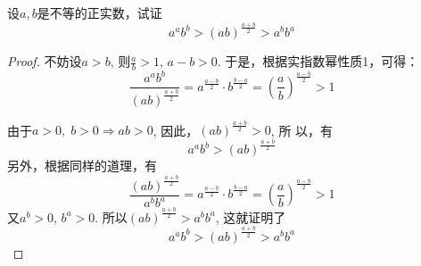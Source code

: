 \begin{example}
    设$a,b$是不等的正实数，试证
\[  a^ab^b>(ab)^{\tfrac{a+b}{2}}>a^bb^a\]
\end{example}

\begin{proof}
  不妨设$a>b$, 则$\frac{a}{b}>1$, $a-b>0$.
  于是，根据实指数幂性质1，可得：
\[\frac{a^ab^b}{(ab)^{\tfrac{a+b}{2}}}=a^{\tfrac{a-b}{2}}\cdot b^{\tfrac{b-a}{2}}=\left(\frac{a}{b}\right)^{\tfrac{a-b}{2}}>1\]

  由于$a>0,\;  b>0\Rightarrow ab>0$, 因此，$(ab)^{\tfrac{a+b}{2}}>0$, 所
  以，有
\[  a^ab^b>(ab)^{\tfrac{a+b}{2}}\]
  另外，根据同样的道理，有
\[\frac{(ab)^{\tfrac{a+b}{2}}}{a^bb^a}=a^{\tfrac{a-b}{2}}\cdot b^{\tfrac{b-a}{2}}=\left(\frac{a}{b}\right)^{\tfrac{a-b}{2}}>1\]
  又$a^b>0$, $b^a>0$. 所以$(ab)^{\tfrac{a+b}{2}}>a^b b^a$, 这就证明了
  \[a^ab^b>(ab)^{\tfrac{a+b}{2}}>a^b b^a\]
\end{proof}

